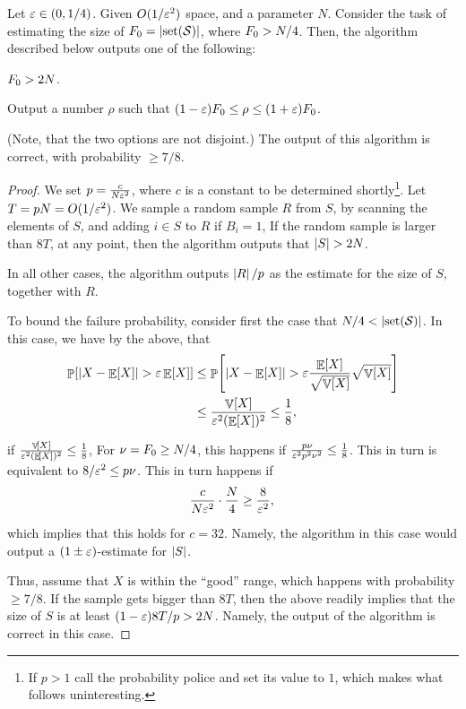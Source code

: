 \begin{lemma}
    Let ${\varepsilon} \in (0,1/4)$.  Given $O(1/{\varepsilon}^2)$ space, and a
    parameter $N$. Consider the task of estimating the size of
    $\Frq_0 = \cardin{\distinctX{\STRM}}$, where $F_0 > N/4$.
    Then, the algorithm described below outputs one of the following:
    \begin{compactenumA}
        \smallskip%
        \item $F_0 > 2N$.
        \smallskip%
        \item Output a number $\rho$ such that
        $(1-{\varepsilon})F_0 \leq \rho \leq (1+{\varepsilon})F_0$.
    \end{compactenumA}
    \smallskip%
    (Note, that the two options are not disjoint.)  The output of this
    algorithm is correct, with probability $\geq 7/8$.
\end{lemma}
\begin{proof}
    We set $p= \frac{c}{N{\varepsilon}^2}$, where $c$ is a constant to be determined
    shortly\footnote{If $p>1$ call the probability police and set its
       value to $1$, which makes what follows uninteresting.}. Let
    $T = p N = O(1/{\varepsilon}^2)$. We sample a random sample $R$ from $S$, by
    scanning the elements of $S$, and adding $i\in S$ to $R$ if $B_i=1$, If
    the random sample is larger than $8T$, at any point, then the
    algorithm outputs that $\left| {S} \right| > 2N$.

    In all other cases, the algorithm outputs $\left| {R} \right| /p$ as the
    estimate for the size of $S$, together with $R$.

    To bound the failure probability, consider first the case that
    $N/4 < \cardin{\distinctX{\STRM}}$. In this case, we have by the
    above, that
    \begin{align*}
        \Prob{\cardin{X - \Ex{X}} > \eps \Ex{X}}%
        &\leq%
        \Prob{\cardin{X - \Ex{X}} > \eps
           \frac{\Ex{X}}{\sqrt{\Var{X}}}
           \sqrt{\Var{X}}}%
        \\&\leq%
        \frac{\Var{X}}{\eps^2(\Ex{X})^2}
        \leq
        \frac{1}{8},
    \end{align*}

    if $\frac{\mathop{\mathbb{V}}\!\left[ {X} \right]}{{\varepsilon}^2 (\mathop{\mathbb{E}}\!\left[ {X} \right])^2} \leq \frac{1}{8}$, For
    $\nu = F_0 \geq N/4$, this happens if
    $\frac{p \nu}{{\varepsilon}^2 p^2 \nu^2} \leq \frac{1}{8}$. This in turn is
    equivalent to $8/{\varepsilon}^2 \leq p \nu $. This in turn happens if
    \begin{equation*}
        \frac{c}{N{\varepsilon}^2} \cdot \frac{N}{4} \geq \frac{8}{{\varepsilon}^2}, \biggr.
    \end{equation*}
    which implies that this holds for $c=32$.  Namely, the algorithm
    in this case would output a $(1\pm{\varepsilon})$-estimate for
    $\left| {S} \right|$.

    Thus, assume that $X$ is within the ``good'' range, which happens
    with probability $\geq 7/8$. If the sample gets bigger than $8T$, then
    the above readily implies that the size of $S$ is at least
    $(1-{\varepsilon})8T/p > 2N$. Namely, the output of the algorithm is correct in
    this case.
\end{proof}
  
